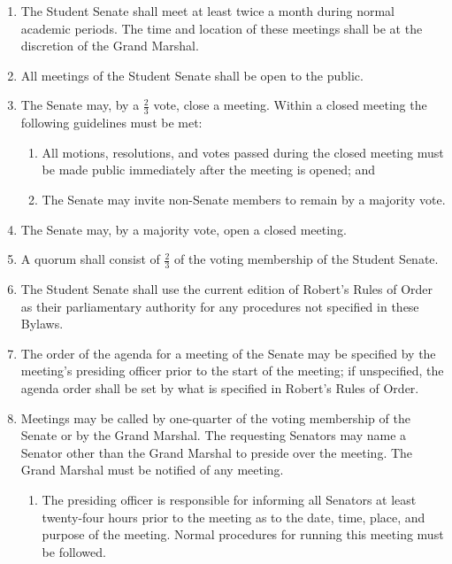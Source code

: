 
\begin{enumerate}

    \item The Student Senate shall meet at least twice a month during normal academic periods. The time and location of these meetings shall be at the discretion of the Grand Marshal.

    \item All meetings of the Student Senate shall be open to the public.

    \item The Senate may, by a $\frac{2}{3}$ vote, close a meeting. Within a closed meeting the following guidelines must be met:
    \begin{enumerate}
        \item All motions, resolutions, and votes passed during the closed meeting must be made public immediately after the meeting is
        opened; and
        \item The Senate may invite non-Senate members to remain by a majority vote.
    \end{enumerate}

    \item The Senate may, by a majority vote, open a closed meeting.

    \item A quorum shall consist of $\frac{2}{3}$ of the voting membership of the Student Senate.

    \item The Student Senate shall use the current edition of Robert’s Rules of Order as their parliamentary authority for any procedures not specified in these Bylaws.

    \item The order of the agenda for a meeting of the Senate may be specified by the meeting’s presiding officer prior to the start of the meeting; if unspecified, the agenda order shall be set by what is specified in Robert’s Rules of Order.

    \item Meetings may be called by one-quarter of the voting membership of the Senate or by the Grand Marshal. The requesting
    Senators may name a Senator other than the Grand Marshal to preside over the meeting. The Grand Marshal must be notified of
    any meeting.
    \begin{enumerate}
        \item The presiding officer is responsible for informing all Senators at least twenty-four hours prior to the meeting as to the date, time, place, and purpose of the meeting. Normal procedures for running this meeting must be followed.
    \end{enumerate}

\end{enumerate}
